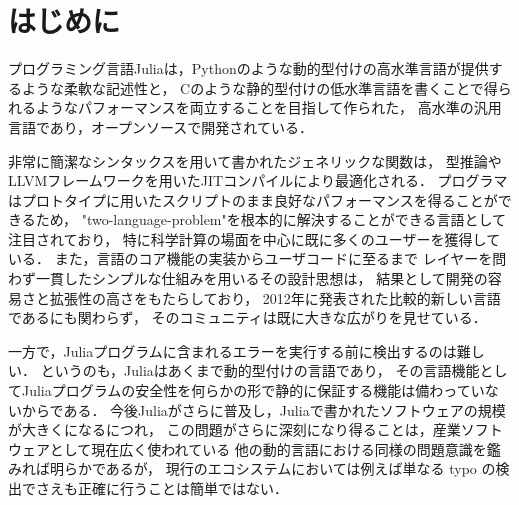 
\section{はじめに}

プログラミング言語Juliaは，Pythonのような動的型付けの高水準言語が提供するような柔軟な記述性と，
Cのような静的型付けの低水準言語を書くことで得られるようなパフォーマンスを両立することを目指して作られた，
高水準の汎用言語であり，オープンソースで開発されている．

非常に簡潔なシンタックスを用いて書かれたジェネリックな関数は，
型推論やLLVMフレームワークを用いたJITコンパイルにより最適化される．
プログラマはプロトタイプに用いたスクリプトのまま良好なパフォーマンスを得ることができるため，
"two-language-problem"\footnotemark を根本的に解決することができる言語として注目されており，
特に科学計算の場面を中心に既に多くのユーザーを獲得している．
また，言語のコア機能の実装からユーザコードに至るまで
レイヤーを問わず一貫したシンプルな仕組みを用いるその設計思想は，
結果として開発の容易さと拡張性の高さをもたらしており，
2012年に発表された比較的新しい言語であるにも関わらず，
そのコミュニティは既に大きな広がりを見せている．


一方で，Juliaプログラムに含まれるエラーを実行する前に検出するのは難しい．
というのも，Juliaはあくまで動的型付けの言語であり，
その言語機能としてJuliaプログラムの安全性を何らかの形で静的に保証する機能は備わっていないからである．
今後Juliaがさらに普及し，Juliaで書かれたソフトウェアの規模が大きくになるにつれ，
この問題がさらに深刻になり得ることは，産業ソフトウェアとして現在広く使われている
他の動的言語における同様の問題意識を鑑みれば明らかであるが\cite{ruby-progress-report}，
現行のエコシステムにおいては例えば単なる typo の検出でさえも正確に行うことは簡単ではない．

